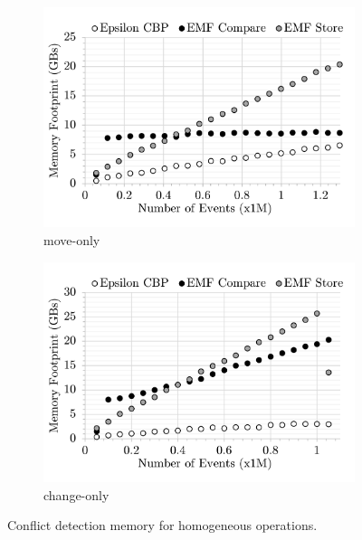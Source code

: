 \begin{figure}[ht]
\begin{subfigure}[t]{0.245\linewidth}
        \includegraphics[width=\linewidth]{move-conflict-memory-events}
        \caption{move-only}
        \label{fig:move-conflict-memory-events}
    \end{subfigure}
    \hfill
    \begin{subfigure}[t]{0.245\linewidth}
        \includegraphics[width=\linewidth]{change-conflict-memory-events}
        \caption{change-only}
        \label{fig:change-conflict-memory-events}
    \end{subfigure}
    \caption{Conflict detection memory for homogeneous operations.}
    \label{fig:homgeneous_operation_memory_events}
\end{figure}

